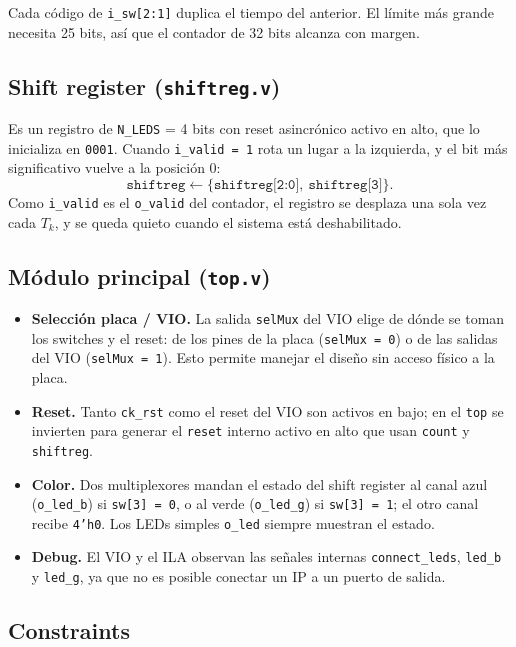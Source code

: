 \documentclass[11pt,a4paper]{scrartcl}
\newcommand{\sig}[1]{\texttt{#1}}
\begin{document}
	Cada código de \sig{i\_sw[2:1]} duplica el tiempo del anterior. El límite más grande
	necesita 25 bits, así que el contador de 32 bits alcanza con margen.

	\subsection{Shift register (\sig{shiftreg.v})}

	Es un registro de \sig{N\_LEDS} = 4 bits con reset asincrónico activo en alto, que lo
	inicializa en \sig{0001}. Cuando \sig{i\_valid = 1} rota un lugar a la izquierda, y el
	bit más significativo vuelve a la posición 0:
	\[
		\sig{shiftreg} \leftarrow \{\sig{shiftreg[2:0]},\ \sig{shiftreg[3]}\} .
	\]
	Como \sig{i\_valid} es el \sig{o\_valid} del contador, el registro se desplaza una sola
	vez cada $T_k$, y se queda quieto cuando el sistema está deshabilitado.

	\subsection{Módulo principal (\sig{top.v})}

	\begin{itemize}
		\item \textbf{Selección placa / VIO.} La salida \sig{selMux} del VIO elige de dónde se
		toman los switches y el reset: de los pines de la placa (\sig{selMux = 0}) o de las
		salidas del VIO (\sig{selMux = 1}). Esto permite manejar el diseño sin acceso físico a
		la placa.
		\item \textbf{Reset.} Tanto \sig{ck\_rst} como el reset del VIO son activos en bajo; en el
		\sig{top} se invierten para generar el \sig{reset} interno activo en alto que usan
		\sig{count} y \sig{shiftreg}.
		\item \textbf{Color.} Dos multiplexores mandan el estado del shift register al canal azul
		(\sig{o\_led\_b}) si \sig{sw[3] = 0}, o al verde (\sig{o\_led\_g}) si \sig{sw[3] = 1}; el
		otro canal recibe \sig{4'h0}. Los LEDs simples \sig{o\_led} siempre muestran el estado.
		\item \textbf{Debug.} El VIO y el ILA observan las señales internas \sig{connect\_leds},
		\sig{led\_b} y \sig{led\_g}, ya que no es posible conectar un IP a un puerto de salida.
	\end{itemize}

	\subsection{Constraints}
\end{document}
